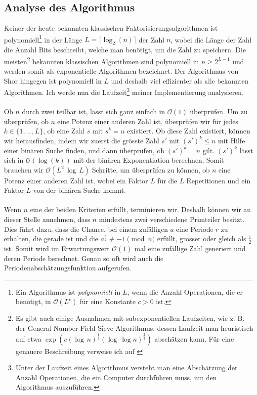\subsection{Analyse des Algorithmus}
Keiner der heute bekannten klassischen Faktorisierungsalgorithmen ist polynomiell\footnote{Ein Algorithmus ist \textit{polynomiell} in $L$, wenn die Anzahl Operationen, die er benötigt, in $\mathcal O(L^c)$ für eine Konstante $c > 0$ ist.} in der Länge $L = \lceil \log_2(n) \rceil$ der Zahl $n$, wobei die Länge der Zahl die Anzahl Bits beschreibt, welche man benötigt, um die Zahl zu speichern. Die meisten\footnote{Es gibt auch einige Ausnahmen mit subexponentiellen Laufzeiten, wie z. B. der General Number Field Sieve Algorithmus, dessen Laufzeit man heuristisch auf etwa $\exp\left(c(\log \, n)^\frac{1}{3}(\log \, \log n)^\frac{2}{3}\right)$ abschätzen kann. Für eine genauere Beschreibung verweise ich auf \cite{gnfs}} bekannten klassischen Algorithmen sind polynomiell in $n \geq 2^{L-1}$ und werden somit als exponentielle Algorithmen bezeichnet. Der Algorithmus von Shor hingegen ist polynomiell in $L$ und deshalb viel effizienter als alle bekannten Algorithmen. Ich werde nun die Laufzeit\footnote{Unter der Laufzeit eines Algorithmus versteht man eine Abschätzung der Anzahl Operationen, die ein Computer durchführen muss, um den Algorithmus auszuführen.} meiner Implementierung analysieren.

\paragraph{}

Ob $n$ durch zwei teilbar ist, lässt sich ganz einfach in $\mathcal O(1)$ überprüfen. Um zu überprüfen, ob $n$ eine Potenz einer anderen Zahl ist, überprüfen wir für jedes $k \in \{1, \dots, L\}$, ob eine Zahl $s$ mit $s^k = n$ existiert. Ob diese Zahl existiert, können wir herausfinden, indem wir zuerst die grösste Zahl $s'$ mit $(s')^k \leq n$ mit Hilfe einer binären Suche finden, und dann überprüfen, ob $(s')^k = n$ gilt. $(s')^k$ lässt sich in $\mathcal{O}(\log(k))$ mit der binären Exponentiation berechnen. Somit brauchen wir $\mathcal{O}(L^2 \, \log \, L)$ Schritte, um überprüfen zu können, ob $n$ eine Potenz einer anderen Zahl ist, wobei ein Faktor $L$ für die $L$ Repetitionen und ein Faktor $L$ von der binären Suche kommt.

\paragraph{}
Wenn $n$ eine der beiden Kriterien erfüllt, terminieren wir. Deshalb können wir an dieser Stelle annehmen, dass $n$ mindestens zwei verschiedene Primteiler besitzt. Dies führt dazu, dass die Chance, bei einem zufälligen $a$ eine Periode $r$ zu erhalten, die gerade ist und die $a^\frac{r}{2} \not\equiv -1 \pmod{n}$ erfüllt, grösser oder gleich als $\frac{1}{2}$ ist. Somit wird im Erwartungswert $\mathcal O(1)$ mal eine zufällige Zahl generiert und deren Periode berechnet. Genau so oft wird auch die Periodenabschätzungsfunktion aufgerufen. 

